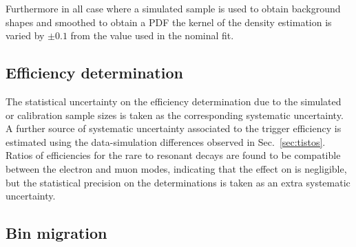 Furthermore in all case where a simulated sample is used to obtain background shapes and smoothed to obtain a PDF
the kernel of the density estimation is varied by $\pm 0.1$ from the value used in the nominal fit.

\subsection{Efficiency determination}

The statistical uncertainty on the efficiency determination due to the simulated or calibration sample sizes 
is taken as the corresponding systematic uncertainty.
%
A further source of systematic uncertainty associated to the trigger efficiency is estimated using the data-simulation
differences observed in Sec.~\ref{sec:tistos}. Ratios of efficiencies for the rare to resonant decays are found to be 
compatible between the electron and muon modes, indicating that the effect on \RKst is negligible, but the statistical 
precision on the determinations is taken as an extra systematic uncertainty.


\subsection{Bin migration}

